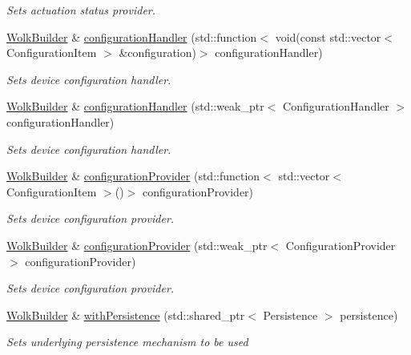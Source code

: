 \begin{DoxyCompactItemize}
\begin{DoxyCompactList}\small\item\em Sets actuation status provider. \end{DoxyCompactList}\item 
\hyperlink{classwolkabout_1_1WolkBuilder}{Wolk\+Builder} \& \hyperlink{classwolkabout_1_1WolkBuilder_a70278ae29af4f3be9f903394491ddd3c}{configuration\+Handler} (std\+::function$<$ void(const std\+::vector$<$ Configuration\+Item $>$ \&configuration)$>$ configuration\+Handler)
\begin{DoxyCompactList}\small\item\em Sets device configuration handler. \end{DoxyCompactList}\item 
\hyperlink{classwolkabout_1_1WolkBuilder}{Wolk\+Builder} \& \hyperlink{classwolkabout_1_1WolkBuilder_ad3862b32ac54bbd90958a4be94ef301a}{configuration\+Handler} (std\+::weak\+\_\+ptr$<$ Configuration\+Handler $>$ configuration\+Handler)
\begin{DoxyCompactList}\small\item\em Sets device configuration handler. \end{DoxyCompactList}\item 
\hyperlink{classwolkabout_1_1WolkBuilder}{Wolk\+Builder} \& \hyperlink{classwolkabout_1_1WolkBuilder_ab8935ff2f79d2d16e4fb2d34a5e7f7c2}{configuration\+Provider} (std\+::function$<$ std\+::vector$<$ Configuration\+Item $>$()$>$ configuration\+Provider)
\begin{DoxyCompactList}\small\item\em Sets device configuration provider. \end{DoxyCompactList}\item 
\hyperlink{classwolkabout_1_1WolkBuilder}{Wolk\+Builder} \& \hyperlink{classwolkabout_1_1WolkBuilder_afb551712f0966a4bf6a6cb86e2c7f37b}{configuration\+Provider} (std\+::weak\+\_\+ptr$<$ Configuration\+Provider $>$ configuration\+Provider)
\begin{DoxyCompactList}\small\item\em Sets device configuration provider. \end{DoxyCompactList}\item 
\hyperlink{classwolkabout_1_1WolkBuilder}{Wolk\+Builder} \& \hyperlink{classwolkabout_1_1WolkBuilder_ab802dd28b9ad64d62b100ca475776446}{with\+Persistence} (std\+::shared\+\_\+ptr$<$ Persistence $>$ persistence)
\begin{DoxyCompactList}\small\item\em Sets underlying persistence mechanism to be used~\newline

\end{DoxyCompactList}
\end{DoxyCompactItemize}
